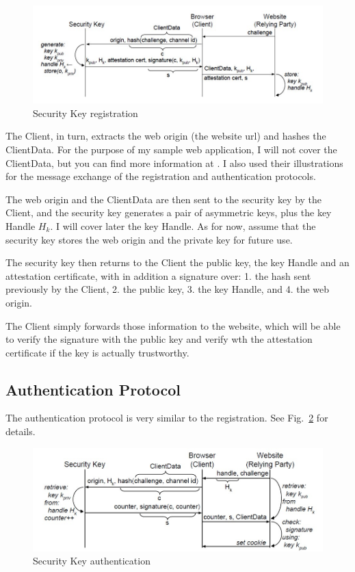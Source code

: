 \begin{figure}[h]
    \centering
    \includegraphics[width=\linewidth]{resources/registration-protocol.jpg}
    \caption{Security Key registration}
    \label{fig:registration-protocol}
\end{figure}

The Client, in turn, extracts the web origin (the website url) and hashes the ClientData. For the purpose of my sample web application, I will not cover the ClientData, but you can find more information at \citet{lang2016security}. I also used their illustrations for the message exchange of the registration and authentication protocols.

The web origin and the ClientData are then sent to the security key by the Client, and the security key generates a pair of asymmetric keys, plus the key Handle $H_k$. I will cover later the key Handle. As for now, assume that the security key stores the web origin and the private key for future use.

The security key then returns to the Client the public key, the key Handle and an attestation certificate, with in addition a signature over: 1. the hash sent previously by the Client, 2. the public key, 3. the key Handle, and 4. the web origin.

The Client simply forwards those information to the website, which will be able to verify the signature with the public key and verify wth the attestation certificate if the key is actually trustworthy.

\subsection{Authentication Protocol}\label{authentication-protocol}
The authentication protocol is very similar to the registration. See Fig.~\ref{fig:authentication-protocol} for details.

\begin{figure}[h]
    \centering
    \includegraphics[width=\linewidth]{resources/authentication-protocol.jpg}
      \caption{Security Key authentication}
      \label{fig:authentication-protocol}
\end{figure}

